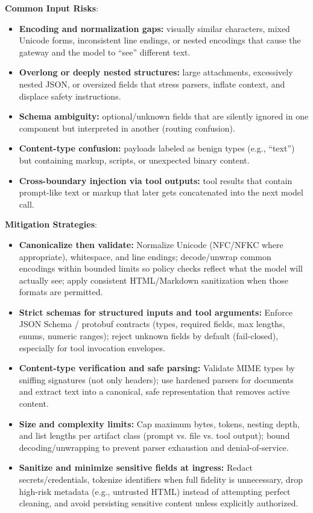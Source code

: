 \begin{TNtwocol}
    \textbf{Common Input Risks}:
    \begin{itemize}
        \item \textbf{Encoding and normalization gaps:} visually similar characters, mixed Unicode forms, inconsistent line endings, or nested encodings that cause the gateway and the model to “see” different text.
        \item \textbf{Overlong or deeply nested structures:} large attachments, excessively nested JSON, or oversized fields that stress parsers, inflate context, and displace safety instructions.
        \item \textbf{Schema ambiguity:} optional/unknown fields that are silently ignored in one component but interpreted in another (routing confusion).
        \item \textbf{Content-type confusion:} payloads labeled as benign types (e.g., “text”) but containing markup, scripts, or unexpected binary content.
        \item \textbf{Cross-boundary injection via tool outputs:} tool results that contain prompt-like text or markup that later gets concatenated into the next model call.
    \end{itemize}

    \textbf{Mitigation Strategies}:
    \begin{itemize}
        \item \textbf{Canonicalize then validate:} Normalize Unicode (NFC/NFKC where appropriate), whitespace, and line endings; decode/unwrap common encodings within bounded limits so policy checks reflect what the model will actually see; apply consistent HTML/Markdown sanitization when those formats are permitted.
        \item \textbf{Strict schemas for structured inputs and tool arguments:} Enforce JSON Schema / protobuf contracts (types, required fields, max lengths, enums, numeric ranges); reject unknown fields by default (fail-closed), especially for tool invocation envelopes.
        \item \textbf{Content-type verification and safe parsing:} Validate MIME types by sniffing signatures (not only headers); use hardened parsers for documents and extract text into a canonical, safe representation that removes active content.
        \item \textbf{Size and complexity limits:} Cap maximum bytes, tokens, nesting depth, and list lengths per artifact class (prompt vs. file vs. tool output); bound decoding/unwrapping to prevent parser exhaustion and denial-of-service.
        \item \textbf{Sanitize and minimize sensitive fields at ingress:} Redact secrets/credentials, tokenize identifiers when full fidelity is unnecessary, drop high-risk metadata (e.g., untrusted HTML) instead of attempting perfect cleaning, and avoid persisting sensitive content unless explicitly authorized.
    \end{itemize}


\end{TNtwocol}

